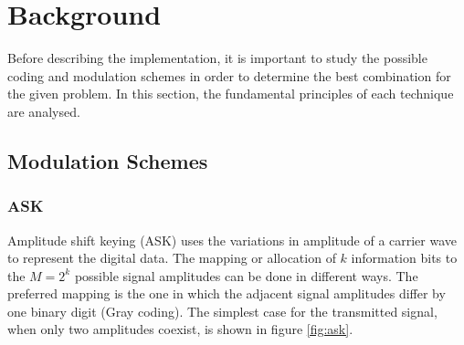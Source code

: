 \documentclass[12pt,a4paper,openright]{report}
\begin{document}



\chapter{Background} %
\label{chap:Background}
Before describing the implementation, it is important to study the possible coding and modulation schemes in order to determine the best combination for the given problem. In this section, the fundamental principles of each technique are analysed.

\section{Modulation Schemes}

\subsection{ASK}
Amplitude shift keying (ASK) uses the variations in amplitude of a carrier wave to represent the digital data. The mapping or allocation of $k$ information bits to the $M=2^k$ possible signal amplitudes can be done in different ways. The preferred mapping is the one in which the adjacent  signal amplitudes differ by one binary digit (Gray coding). The simplest case for the transmitted signal, when only two amplitudes coexist, is shown in figure \ref{fig:ask}. 
\end{document}
